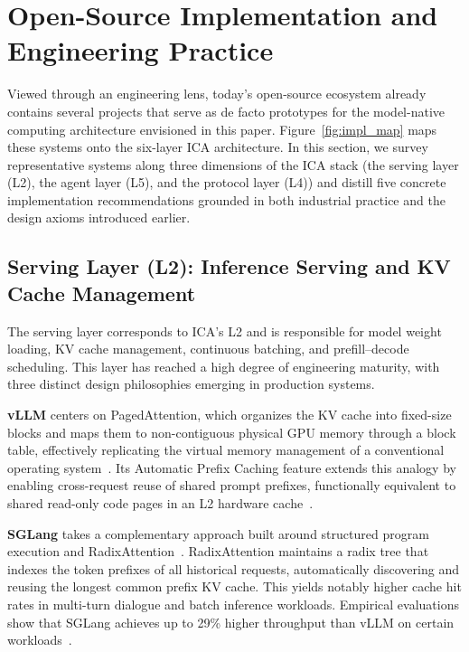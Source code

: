 \section{Open-Source Implementation and Engineering Practice}
\label{sec:implementation}

Viewed through an engineering lens, today's open-source ecosystem already contains several projects that serve as de facto prototypes for the model-native computing architecture envisioned in this paper. Figure~\ref{fig:impl_map} maps these systems onto the six-layer ICA architecture. In this section, we survey representative systems along three dimensions of the ICA stack (the serving layer (L2), the agent layer (L5), and the protocol layer (L4)) and distill five concrete implementation recommendations grounded in both industrial practice and the design axioms introduced earlier.



\subsection{Serving Layer (L2): Inference Serving and KV Cache Management}
\label{sec:impl-serving}

The serving layer corresponds to ICA's L2 and is responsible for model weight loading, KV cache management, continuous batching, and prefill--decode scheduling. This layer has reached a high degree of engineering maturity, with three distinct design philosophies emerging in production systems.

\textbf{vLLM} centers on PagedAttention, which organizes the KV cache into fixed-size blocks and maps them to non-contiguous physical GPU memory through a block table, effectively replicating the virtual memory management of a conventional operating system~\cite{kwon2023pagedattention,vllm_docs_2026}. Its Automatic Prefix Caching feature extends this analogy by enabling cross-request reuse of shared prompt prefixes, functionally equivalent to shared read-only code pages in an L2 hardware cache~\cite{vllm_prefix_2026}.

\textbf{SGLang} takes a complementary approach built around structured program execution and RadixAttention~\cite{sglang2024,sglang_docs_2026}. RadixAttention maintains a radix tree that indexes the token prefixes of all historical requests, automatically discovering and reusing the longest common prefix KV cache. This yields notably higher cache hit rates in multi-turn dialogue and batch inference workloads. Empirical evaluations show that SGLang achieves up to 29\% higher throughput than vLLM on certain workloads~\cite{sglang2024}.

